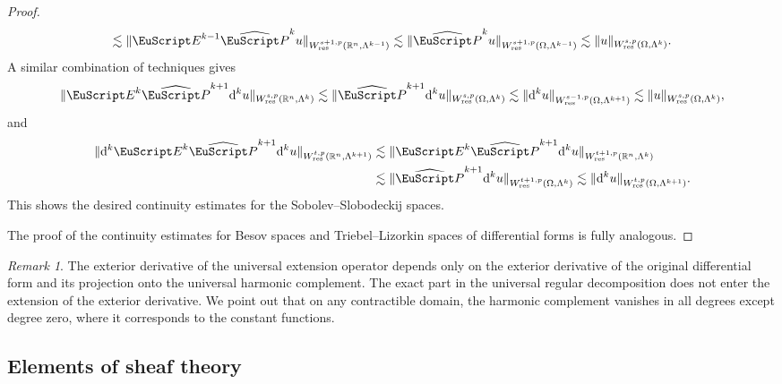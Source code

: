 \documentclass[10pt,a4paper]{amsart}
\theoremstyle{definition}
\theoremstyle{remark}
\newtheorem{remark}[theorem]{Remark}
\numberwithin{equation}{section}
\newcommand{\bbR}{{\mathbb R}}
\newcommand{\euE}{{\EuScript E}}
\newcommand{\euP}{{\EuScript P}}
\newcommand{\cartan}{{\mathrm d}}
\newcommand{\Domain}{{\Omega}}
\newcommand{\Alt}[1]{\Lambda^{#1}}
\newcommand{\Poincare}{\euP}
\newcommand{\Extension}{\euE}
\newcommand{\Wres}{W_{\mathrm{res}}}
\begin{document}
\begin{proof}
\begin{align*}
        \lesssim
        \| \Extension^{k-1} \widehat\Poincare^{k} u \|_{\Wres^{s+1,p}(\bbR^{n},\Alt{k-1})}
        \lesssim
        \| \widehat\Poincare^{k} u \|_{\Wres^{s+1,p}(\Domain,\Alt{k-1})}
        \lesssim
        \| u \|_{\Wres^{s,p}(\Domain,\Alt{k})}
        .
    \end{align*}
    A similar combination of techniques gives 
    \begin{align*}
        \| \Extension^{k} \widehat\Poincare^{k+1} \cartan^{k} u \|_{\Wres^{s,p}(\bbR^{n},\Alt{k})}
        \lesssim
        \| \widehat\Poincare^{k+1} \cartan^{k} u \|_{\Wres^{s,p}(\Domain,\Alt{k})}
        \lesssim
        \| \cartan^{k} u \|_{\Wres^{s-1,p}(\Domain,\Alt{k+1})}
        \lesssim
        \| u \|_{\Wres^{s,p}(\Domain,\Alt{k})}
        ,
    \end{align*}
    and 
    \begin{align*}
        \| \cartan^{k} \Extension^{k} \widehat\Poincare^{k+1} \cartan^{k} u \|_{\Wres^{t,p}(\bbR^{n},\Alt{k+1})}
        &
        \lesssim
        \| \Extension^{k} \widehat\Poincare^{k+1} \cartan^{k} u \|_{\Wres^{t+1,p}(\bbR^{n},\Alt{k})}
        \\&
        \lesssim
        \| \widehat\Poincare^{k+1} \cartan^{k} u \|_{\Wres^{t+1,p}(\Domain,\Alt{k})}
        \lesssim
        \| \cartan^{k} u \|_{\Wres^{t,p}(\Domain,\Alt{k+1})}
        .
    \end{align*}
    This shows the desired continuity estimates for the Sobolev--Slobodeckij spaces. 
    
    The proof of the continuity estimates for Besov spaces and Triebel--Lizorkin spaces of differential forms is fully analogous.
\end{proof}


\begin{remark}
    The exterior derivative of the universal extension operator depends only on the exterior derivative of the original differential form 
    and its projection onto the universal harmonic complement. 
    The exact part in the universal regular decomposition does not enter the extension of the exterior derivative.
    We point out that on any contractible domain, the harmonic complement vanishes in all degrees except degree zero, where it corresponds to the constant functions.
\end{remark}




\subsection{Elements of sheaf theory}
\end{document}
